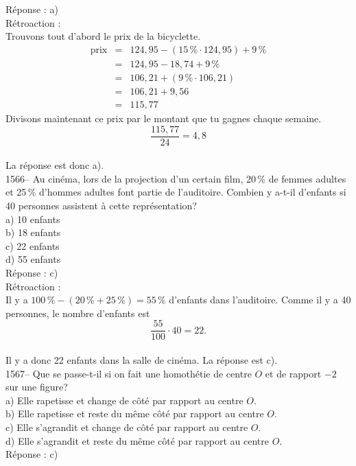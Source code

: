 R\'eponse : a)\\

R\'etroaction :\\
Trouvons tout d'abord le prix de la bicyclette.
\begin{eqnarray*}
{\textrm{prix}}&=&124,95-(15\,\%\cdot124,95)+9\,\% \\ &=&124,95-18,74+9\,\%
\\
&=&106,21+(9\,\%\cdot106,21) \\&=&106,21+9,56 \\&=&115,77
\end{eqnarray*}
Divisons maintenant ce prix par le montant que tu gagnes chaque
semaine.
$$\frac{115,77}{24}=4,8$$\\
La r\'eponse est donc a).\\

1566-- Au cin\'ema, lors de la projection d'un certain film, 20\,\%
de femmes adultes et 25\,\% d'hommes adultes font partie de
l'auditoire. Combien y a-t-il
d'enfants si 40 personnes assistent \`a cette repr\'esentation?\\
a) 10 enfants\\
b) 18 enfants\\
c) 22 enfants\\
d) 55 enfants\\

R\'eponse : c)\\

R\'etroaction :\\
Il y a $100\,\%-(20\,\%+25\,\%)=55\,\%$ d'enfants dans l'auditoire.
Comme il y a 40 personnes, le nombre
d'enfants est $$\frac{55}{100}\cdot40=22.$$\\ Il y a donc 22 enfants dans la
salle de cin\'ema. La r\'eponse est c).\\

1567-- Que se passe-t-il si on fait une homoth\'etie de centre $O$ et
de rapport $-2$ sur une figure?\\
a) Elle rapetisse et change de c\^ot\'e par rapport au centre $O$.\\
b) Elle rapetisse et reste du m\^eme c\^ot\'e par rapport au centre $O$.\\
c) Elle s'agrandit et change de c\^ot\'e par rapport au centre $O$.\\
d) Elle s'agrandit et reste du m\^eme c\^ot\'e par rapport au centre $O$.\\

R\'eponse : c)\\


